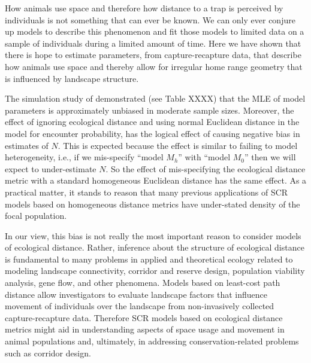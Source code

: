 How animals use space and therefore how distance to a trap is
perceived by individuals is not something that can ever be known. We
can only ever conjure up models to describe this phenomenon and fit
those models to limited data on a sample of individuals during a
limited amount of time.  Here we have shown that there is hope to
estimate parameters, from capture-recapture data, that describe how
animals use space and thereby allow for irregular home range geometry
that is influenced by landscape structure.

The simulation study of \citet{royle_etal:2012ecol} demonstrated (see
Table XXXX) that the MLE of model parameters is approximately unbiased
in moderate sample sizes. Moreover, the effect of ignoring ecological
distance and using normal Euclidean distance in the model for
encounter probability, has the logical effect of causing negative bias
in estimates of $N$.  This is expected because the effect is similar
to failing to model heterogeneity, i.e., if we mis-specify ``model
$M_h$'' \citep{otis_etal:1978} with ``model $M_0$''
\citep{otis_etal:1978} then we will expect to under-estimate $N$. So
the effect of mis-specifying the ecological distance metric with a
standard homogeneous Euclidean distance has the same effect. As a
practical matter, it stands to reason that many previous applications
of SCR models based on homogeneous distance metrics have under-stated
density of the focal population.

In our view, this bias is not really the most important reason to
consider models of ecological distance. Rather, inference about the
structure of ecological distance is fundamental to many problems in
applied and theoretical ecology related to modeling landscape
connectivity, corridor and reserve design, population viability
analysis, gene flow, and other phenomena.  Models based on least-cost
path distance allow investigators to evaluate landscape factors that
influence movement of individuals over the landscape from
non-invasively collected capture-recapture data.  Therefore SCR models
based on ecological distance metrics might aid in understanding
aspects of space usage and movement in animal populations and,
ultimately, in addressing conservation-related problems such as
corridor design.

